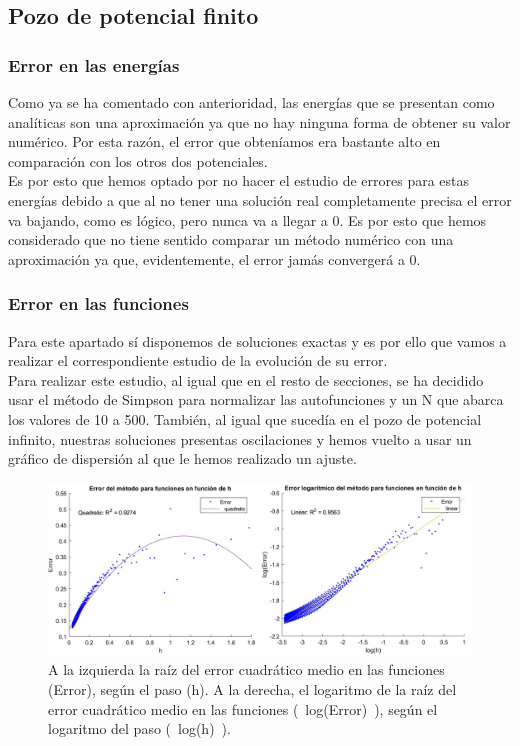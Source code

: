 \documentclass[12pt]{article}
\begin{document}
\subsection{Pozo de potencial finito}

\subsubsection{Error en las energías}

Como ya se ha comentado con anterioridad, las energías 
que se presentan como analíticas son una aproximación ya que 
no hay ninguna forma de obtener su valor numérico. Por esta
razón, el error que obteníamos era bastante alto en comparación
con los otros dos potenciales. \\

Es por esto que hemos optado por no hacer el estudio de errores para estas energías debido a que al no tener una solución real completamente precisa el error va bajando, como es lógico, pero nunca va a llegar a 0. Es por esto que hemos considerado que no tiene sentido comparar un método numérico con una aproximación ya que, evidentemente, el error jamás convergerá a 0.

\subsubsection{Error en las funciones}

Para este apartado sí disponemos de soluciones exactas y es 
por ello que vamos a realizar el correspondiente estudio de la 
evolución de su error. \\

Para realizar este estudio, al igual que en el resto de secciones, 
se ha decidido usar el método de Simpson para normalizar las 
autofunciones y un N que abarca los valores de 10 a 500. 
También, al igual que sucedía en el pozo de potencial 
infinito, nuestras soluciones presentas oscilaciones y hemos 
vuelto a usar un gráfico de dispersión al que le hemos realizado 
un ajuste.

\begin{figure}[H]
    \centering
    \begin{adjustbox}{width=1.2\linewidth,center}
        \includegraphics{fotos/errorfinitofunciones.png}
    \end{adjustbox}
    \caption{A la izquierda la raíz del error cuadrático medio en las funciones (Error), según el paso (h). A la derecha, el logaritmo de la raíz del error cuadrático medio en las funciones (~log(Error)~), según el logaritmo del paso (~log(h)~).}
\end{figure}
\end{document}
